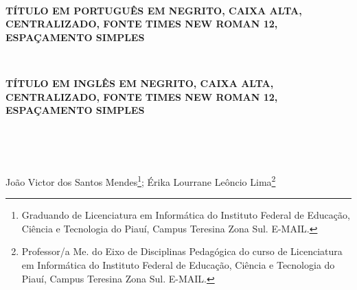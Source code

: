\documentclass[
    article, 
    12pt, 
    oneside, 
    a4paper, 
    english, 
    brazil
    ]{abntex2}
\begin{document}

    \

    \begin{center}
        \textbf{TÍTULO EM PORTUGUÊS EM NEGRITO, CAIXA ALTA, CENTRALIZADO, FONTE TIMES NEW ROMAN 12, ESPAÇAMENTO SIMPLES}

        \
  
        \textbf{TÍTULO EM INGLÊS EM NEGRITO, CAIXA ALTA, CENTRALIZADO, FONTE TIMES NEW ROMAN 12, ESPAÇAMENTO SIMPLES}

        \


        \

        João Victor dos Santos Mendes\footnote{Graduando de Licenciatura em Informática do Instituto Federal de Educação, Ciência e Tecnologia do Piauí, Campus Teresina Zona Sul. E-MAIL.}; Érika Lourrane Leôncio Lima\footnote{Professor/a Me. do Eixo de Disciplinas Pedagógica do curso de Licenciatura em Informática do Instituto Federal de Educação, Ciência e Tecnologia do Piauí, Campus Teresina Zona Sul. E-MAIL.}
    \end{center}

    
    
    
    
\end{document}
